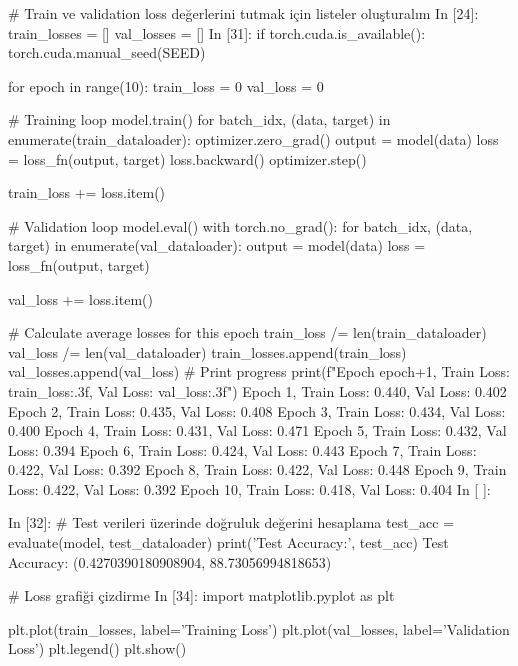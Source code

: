 \documentclass[11pt]{article}
\begin{document}
\begin{python}
# Train ve validation loss değerlerini tutmak için listeler oluşturalım
In [24]:
train_losses = []
val_losses = []
In [31]:
if torch.cuda.is_available():
    torch.cuda.manual_seed(SEED)

for epoch in range(10):
    train_loss = 0
    val_loss = 0

    # Training loop
    model.train()
    for batch_idx, (data, target) in enumerate(train_dataloader):
        optimizer.zero_grad()
        output = model(data)
        loss = loss_fn(output, target)
        loss.backward()
        optimizer.step()

        train_loss += loss.item()

    # Validation loop
    model.eval()
    with torch.no_grad():
        for batch_idx, (data, target) in enumerate(val_dataloader):
            output = model(data)
            loss = loss_fn(output, target)

            val_loss += loss.item()

    # Calculate average losses for this epoch
    train_loss /= len(train_dataloader)
    val_loss /= len(val_dataloader)
    train_losses.append(train_loss)
    val_losses.append(val_loss)
    # Print progress
    print(f"Epoch {epoch+1}, Train Loss: {train_loss:.3f}, Val Loss: {val_loss:.3f}")
Epoch 1, Train Loss: 0.440, Val Loss: 0.402
Epoch 2, Train Loss: 0.435, Val Loss: 0.408
Epoch 3, Train Loss: 0.434, Val Loss: 0.400
Epoch 4, Train Loss: 0.431, Val Loss: 0.471
Epoch 5, Train Loss: 0.432, Val Loss: 0.394
Epoch 6, Train Loss: 0.424, Val Loss: 0.443
Epoch 7, Train Loss: 0.422, Val Loss: 0.392
Epoch 8, Train Loss: 0.422, Val Loss: 0.448
Epoch 9, Train Loss: 0.422, Val Loss: 0.392
Epoch 10, Train Loss: 0.418, Val Loss: 0.404
In [ ]:
 
In [32]:
# Test verileri üzerinde doğruluk değerini hesaplama
test_acc = evaluate(model, test_dataloader)
print('Test Accuracy:', test_acc)
Test Accuracy: (0.4270390180908904, 88.73056994818653)

# Loss grafiği çizdirme
In [34]:
import matplotlib.pyplot as plt

plt.plot(train_losses, label='Training Loss')
plt.plot(val_losses, label='Validation Loss')
plt.legend()
plt.show()
\end{python}

\end{document}
